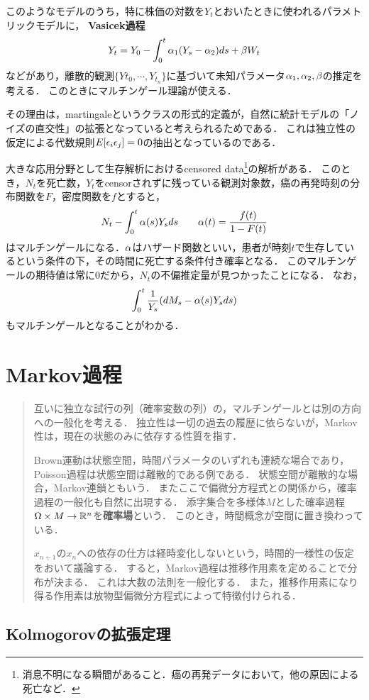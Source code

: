 \documentclass[uplatex,dvipdfmx]{jsreport}
\begin{document}
このようなモデルのうち，特に株価の対数を$Y_t$とおいたときに使われるパラメトリックモデルに，
\textbf{Vasicek過程}
\[Y_t=Y_0-\int^t_0\alpha_1(Y_s-\alpha_2)ds+\beta W_t\]
などがあり，離散的観測$\{Y{t_0},\cdots,Y_{t_n}\}$に基づいて未知パラメータ$\alpha_1,\alpha_2,\beta$の推定を考える．
このときにマルチンゲール理論が使える．

その理由は，martingaleというクラスの形式的定義が，自然に統計モデルの「ノイズの直交性」の拡張となっていると考えられるためである．
これは独立性の仮定による代数規則$E[\epsilon_i\epsilon_j]=0$の抽出となっているのである．

大きな応用分野として生存解析におけるcensored data\footnote{消息不明になる瞬間があること．癌の再発データにおいて，他の原因による死亡など．}の解析がある．
このとき，$N_t$を死亡数，$Y_t$をcensorされずに残っている観測対象数，癌の再発時刻の分布関数を$F$，密度関数を$f$とすると，
\[N_t-\int^t_0\alpha(s)Y_sds\qquad\alpha(t)=\frac{f(t)}{1-F(t)}\]
はマルチンゲールになる．$\alpha$はハザード関数といい，患者が時刻$t$で生存しているという条件の下，その時間に死亡する条件付き確率となる．
このマルチンゲールの期待値は常に$0$だから，$N_t$の不偏推定量が見つかったことになる．
なお，
\[\int^t_0\frac{1}{Y_s}(dM_s-\alpha(s)Y_sds)\]
もマルチンゲールとなることがわかる．

\chapter{Markov過程}

\begin{quote}
    互いに独立な試行の列（確率変数の列）の，マルチンゲールとは別の方向への一般化を考える．
    独立性は一切の過去の履歴に依らないが，Markov性は，現在の状態のみに依存する性質を指す．

    Brown運動は状態空間，時間パラメータのいずれも連続な場合であり，Poisson過程は状態空間は離散的である例である．
    状態空間が離散的な場合，Markov連鎖ともいう．
    またここで偏微分方程式との関係から，確率過程の一般化も自然に出現する．
    添字集合を多様体$M$とした確率過程$\Omega\times M\to\mathbb{R}^n$を\textbf{確率場}という．
    このとき，時間概念が空間に置き換わっている．

    $x_{n+1}$の$x_n$への依存の仕方は経時変化しないという，時間的一様性の仮定をおいて議論する．
    すると，Markov過程は推移作用素を定めることで分布が決まる．
    これは大数の法則を一般化する．
    また，推移作用素になり得る作用素は放物型偏微分方程式によって特徴付けられる．
\end{quote}

\section{Kolmogorovの拡張定理}
\end{document}

